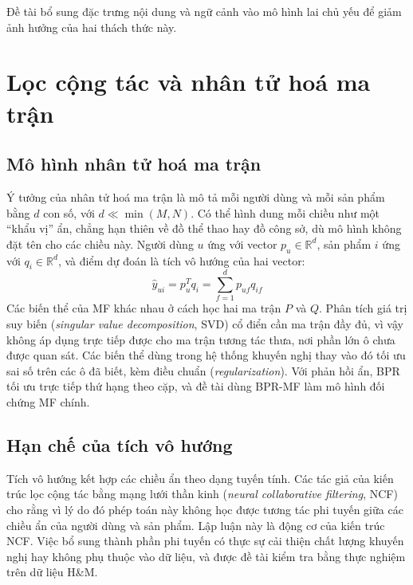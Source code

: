 Đề tài bổ sung đặc trưng nội dung và ngữ cảnh vào mô hình lai chủ yếu để giảm ảnh hưởng của hai thách thức này.

\section{Lọc cộng tác và nhân tử hoá ma trận}
\label{sec:cf_mf}

\subsection{Mô hình nhân tử hoá ma trận}
\label{subsec:mf_model}

Ý tưởng của nhân tử hoá ma trận \parencite{koren2009matrix} là mô tả mỗi người dùng và mỗi sản phẩm bằng $d$ con số, với $d \ll \min(M, N)$. Có thể hình dung mỗi chiều như một ``khẩu vị'' ẩn, chẳng hạn thiên về đồ thể thao hay đồ công sở, dù mô hình không đặt tên cho các chiều này. Người dùng $u$ ứng với vector $p_u \in \mathbb{R}^d$, sản phẩm $i$ ứng với $q_i \in \mathbb{R}^d$, và điểm dự đoán là tích vô hướng của hai vector:
\begin{equation*}
    \hat{y}_{ui} = p_u^T q_i = \sum_{f=1}^{d} p_{uf} q_{if}
\end{equation*}
Các biến thể của MF khác nhau ở cách học hai ma trận $P$ và $Q$. Phân tích giá trị suy biến (\textit{singular value decomposition}, SVD) cổ điển cần ma trận đầy đủ, vì vậy không áp dụng trực tiếp được cho ma trận tương tác thưa, nơi phần lớn ô chưa được quan sát. Các biến thể dùng trong hệ thống khuyến nghị thay vào đó tối ưu sai số trên các ô đã biết, kèm điều chuẩn (\textit{regularization}). Với phản hồi ẩn, BPR tối ưu trực tiếp thứ hạng theo cặp, và đề tài dùng BPR-MF làm mô hình đối chứng MF chính.

\subsection{Hạn chế của tích vô hướng}
\label{subsec:mf_limitations}

Tích vô hướng kết hợp các chiều ẩn theo dạng tuyến tính. Các tác giả của kiến trúc lọc cộng tác bằng mạng lưới thần kinh (\textit{neural collaborative filtering}, NCF) cho rằng vì lý do đó phép toán này không học được tương tác phi tuyến giữa các chiều ẩn của người dùng và sản phẩm. Lập luận này là động cơ của kiến trúc NCF. Việc bổ sung thành phần phi tuyến có thực sự cải thiện chất lượng khuyến nghị hay không phụ thuộc vào dữ liệu, và được đề tài kiểm tra bằng thực nghiệm trên dữ liệu H\&M.

